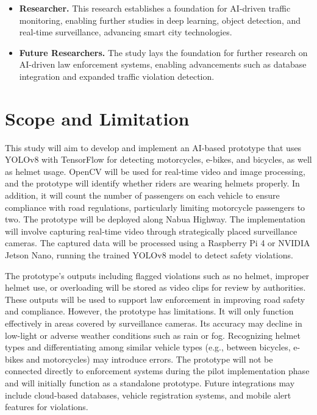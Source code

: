 \begin{refsection}
\begin{itemize}
    \item \textbf{Researcher.} This research establishes a foundation for AI-driven traffic monitoring, enabling further studies in deep learning, object detection, and real-time surveillance, advancing smart city technologies.
    
    \item \textbf{Future Researchers.} The study lays the foundation for further research on AI-driven law enforcement systems, enabling advancements such as database integration and expanded traffic violation detection.
\end{itemize}

\section{Scope and Limitation}

This study will aim to develop and implement an AI-based prototype that uses YOLOv8 with TensorFlow for detecting motorcycles, e-bikes, and bicycles, as well as helmet usage. OpenCV will be used for real-time video and image processing, and the prototype will identify whether riders are wearing helmets properly. In addition, it will count the number of passengers on each vehicle to ensure compliance with road regulations, particularly limiting motorcycle passengers to two. The prototype will be deployed along Nabua Highway. The implementation will involve capturing real-time video through strategically placed surveillance cameras. The captured data will be processed using a Raspberry Pi 4 or NVIDIA Jetson Nano, running the trained YOLOv8 model to detect safety violations.

The prototype’s outputs including flagged violations such as no helmet, improper helmet use, or overloading will be stored as video clips for review by authorities. These outputs will be used to support law enforcement in improving road safety and compliance. However, the prototype has limitations. It will only function effectively in areas covered by surveillance cameras. Its accuracy may decline in low-light or adverse weather conditions such as rain or fog. Recognizing helmet types and differentiating among similar vehicle types (e.g., between bicycles, e-bikes and motorcycles) may introduce errors. The prototype will not be connected directly to enforcement systems during the pilot implementation phase and will initially function as a standalone prototype. Future integrations may include cloud-based databases, vehicle registration systems, and mobile alert features for violations.



\end{refsection}
